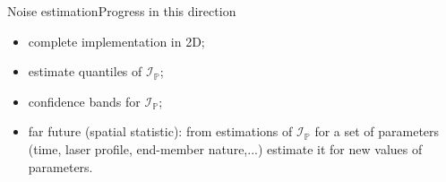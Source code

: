 \begin{frame}{Noise estimation}{Progress in this direction}
\begin{itemize}
\item complete implementation in 2D;
\item estimate quantiles of $\mathcal{I}_{\mathds{P}}$;
\item confidence bands for $\mathcal{I}_{\mathds{P}}$;
\item far future (spatial statistic): from estimations of $\mathcal{I}_{\mathds{P}}$ for a set of parameters (time, laser profile, end-member nature,...) estimate it for new values of parameters.
\end{itemize}
\end{frame}